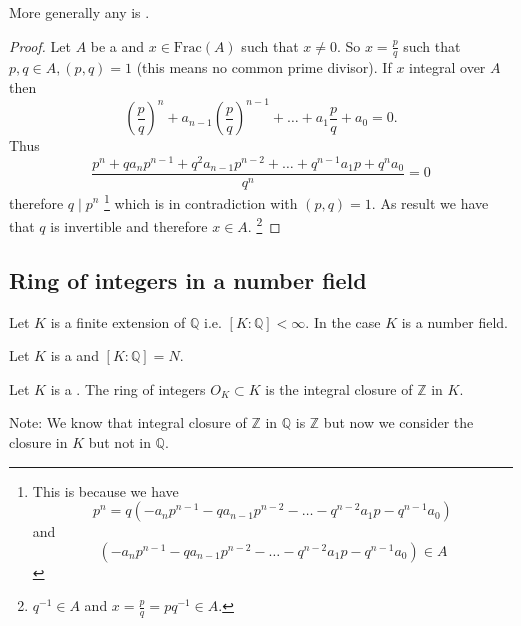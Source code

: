\begin{remark}
  More generally any
   is .
  \begin{proof}
    Let $A$ be a  and $x \in \mathrm {Frac}(A)$ such
    that $x \ne 0$. So
    $x = \frac{p}{q}$ such that $p,q \in A, \left(p, q\right) = 1$
    (this means no common prime divisor). If $x$ integral over $A$
    then
    \[
    \left(\frac{p}{q}\right)^n + a_{n-1}\left(\frac{p}{q}\right)^{n-1}
    + \dots + a_1 \frac{p}{q} + a_0 = 0.
    \]
    Thus
    \[
    \frac{p^n + q a_n p^{n-1} + q^2 a_{n-1} p^{n-2} + \dots + q^{n-1}
      a_1 p + q^n a_0}{q^n} = 0
    \]
    therefore $q \mid p^n$
    \footnote{
      This is because we have
      \[
      p^n = q \left(-a_n p^{n-1} - q a_{n-1} p^{n-2} - \dots - q^{n-2}
      a_1 p - q^{n-1} a_0\right)
      \]
      and
      \[
      \left(-a_n p^{n-1} - q a_{n-1} p^{n-2} - \dots - q^{n-2}
      a_1 p - q^{n-1} a_0\right) \in A
      \]
    }
    which is in contradiction with
    $\left(p, q\right) = 1$. As result we have that $q$ is invertible
    and therefore $x \in A$.
    \footnote{
      $q^{-1} \in A$ and $x = \frac{p}{q} = p q^{-1} \in A$.
    }
    \end{proof}
\end{remark}

\subsection{Ring of integers in a number field}

\begin{definition}
  Let $K$ is a finite extension of $\mathbb{Q}$ i.e.
  $\left[K:\mathbb{Q}\right] < \infty$. In the case $K$ is a number
  field. 
  \label{def:numberfield}
\end{definition}

Let $K$ is a  and $\left[K:\mathbb{Q}\right]
= N$.
\begin{definition}
  Let $K$ is a . The ring of integers
  $O_K \subset K$ is the integral closure of $\mathbb{Z}$
  in $K$. 

  Note: We know that integral closure of $\mathbb{Z}$ in $\mathbb{Q}$
  is $\mathbb{Z}$ but now we consider the closure in $K$ but not in
  $\mathbb{Q}$. 
  \label{def:ringintegers}
\end{definition}

